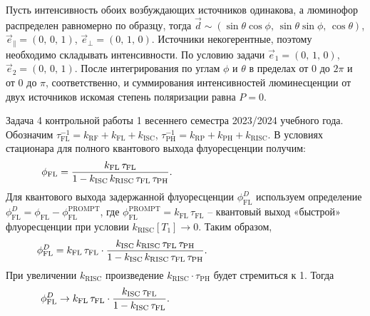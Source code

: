  Пусть интенсивность обоих возбуждающих источников одинакова, а люминофор распределен равномерно по образцу, тогда $\vec{d} \sim (\sin{\theta}\cos{\phi},\, \sin{\theta}\sin{\phi},\, \cos{\theta})$, $\vec{e}_{\parallel} = (0,\,0,\,1)$, $\vec{e}_{\perp} = (0,\,1,\,0)$. Источники некогерентные, поэтому необходимо складывать интенсивности. По условию задачи $\vec{e}_1 = (0,\, 1,\, 0)$, $\vec{e}_2 = (0,\, 0,\, 1)$. После интегрирования по углам $\phi$ и $\theta$ в пределах от 0 до $2\pi$ и от 0 до $\pi$, соответственно, и суммирования интенсивностей люминесценции от двух источников искомая степень поляризации равна $P = 0$.\par
{} Задача 4 контрольной работы 1 весеннего семестра 2023/2024 учебного года. Обозначим $\tau_{\text{FL}}^{-1} = k_{\text{RF}} + k_{\text{FL}} + k_{\text{ISC}}$, $\tau_{\text{PH}}^{-1} = k_{\text{RP}} + k_{\text{PH}} + k_{\text{RISC}}$. В условиях стационара для полного квантового выхода флуоресценции получим:
\begin{equation*}
\begin{aligned}
& \phi_{\text{FL}} = \dfrac{k_{\text{FL}} \, \tau_{\text{FL}}}{1 - k_{\text{ISC}} \, k_{\text{RISC}}\,\tau_{\text{FL}} \, \tau_{\text{PH}}}. \hspace{52mm}
\end{aligned}
\end{equation*}
Для квантового выхода задержанной флуоресценции $\phi_{\text{FL}}^D$ используем определение $\phi_{\text{FL}}^D = \phi_{\text{FL}} - \phi_{\text{FL}}^{\text{PROMPT}}$, где $\phi_{\text{FL}}^{\text{PROMPT}} = k_{\text{FL}} \, \tau_{\text{FL}}$ – квантовый выход «быстрой» флуоресценции при условии $k_{\text{RISC}} \left[ T_1 \right] \rightarrow 0$. Таким образом,
\begin{equation*}
\begin{aligned}
& \phi_{\text{FL}}^D = k_{\text{FL}} \, \tau_{\text{FL}} \cdot \dfrac{k_{\text{ISC}} \, k_{\text{RISC}} \, \tau_{\text{FL}} \, \tau_{\text{PH}}}{1 - k_{\text{ISC}}\, k_{\text{RISC}} \, \tau_{\text{FL}} \, \tau_{\text{PH}}}. \hspace{41mm}
\end{aligned}
\end{equation*}
При увеличении $k_{\text{RISC}}$ произведение $k_{\text{RISC}}\cdot \tau_{\text{PH}}$ будет стремиться к 1. Тогда
\begin{equation*}
\begin{aligned}
& \phi_{\text{FL}}^D \rightarrow k_{\text{FL}} \, \tau_{\text{FL}} \cdot \dfrac{k_{\text{ISC}} \, \tau_{\text{FL}} }{1 - k_{\text{ISC}}\,  \tau_{\text{FL}}}. \hspace{53mm}
\end{aligned}
\end{equation*}
